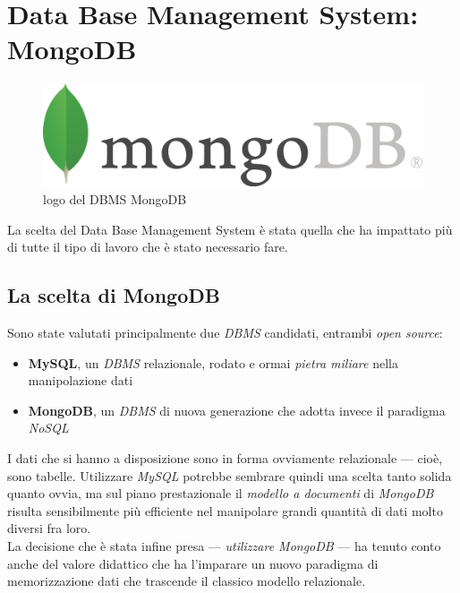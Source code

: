 \section{Data Base Management System: MongoDB}

    \begin{figure}
        \centering
        \caption{logo del DBMS MongoDB}
        \label{mongodb_logo}
    	\includegraphics[scale=0.70]{img/mongodb.png}
    \end{figure}

    La scelta del Data Base Management System è stata quella che ha impattato più di tutte il tipo di lavoro che è stato necessario fare.

    \subsection{La scelta di MongoDB}
    
        Sono state valutati principalmente due \textit{DBMS} candidati, entrambi \textit{open source}:

        \begin{itemize}
            \item \textbf{MySQL}, un \textit{DBMS} relazionale, rodato e ormai \textit{pietra miliare} nella manipolazione dati
            \item \textbf{MongoDB}, un \textit{DBMS} di nuova generazione che adotta invece il paradigma \textit{NoSQL} 
        \end{itemize}

        I dati che si hanno a disposizione sono in forma ovviamente relazionale --- cioè, sono tabelle. Utilizzare \textit{MySQL} potrebbe sembrare quindi una scelta tanto solida quanto ovvia, ma sul piano prestazionale il \textit{modello a documenti} di \textit{MongoDB} risulta sensibilmente più efficiente nel manipolare grandi quantità di dati molto diversi fra loro. \\

        La decisione che è stata infine presa --- \textit{utilizzare MongoDB} --- ha tenuto conto anche del valore didattico che ha l'imparare un nuovo paradigma di memorizzazione dati che trascende il classico modello relazionale.

